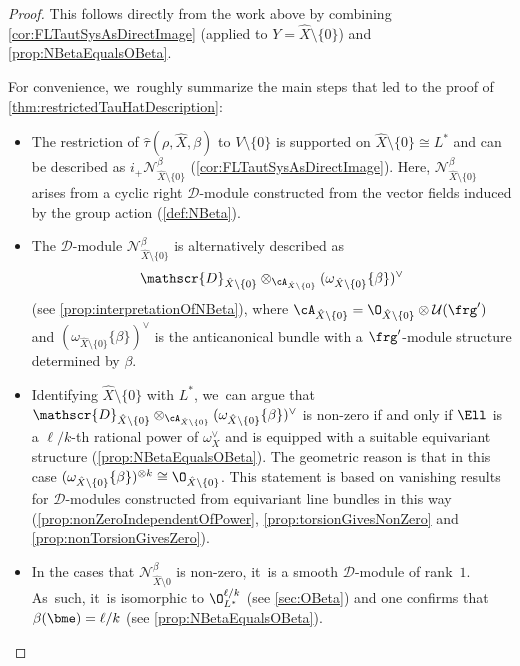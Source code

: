 \begin{proof}
This follows directly from the work above by combining \cref{cor:FLTautSysAsDirectImage} (applied to $Y = \hat X \setminus \{0\}$) and \cref{prop:NBetaEqualsOBeta}.

For convenience, we~roughly summarize the main steps that led to the proof of \cref{thm:restrictedTauHatDescription}:

\begin{itemize}
\item The restriction of $\hat{\tau}(\rho, \hat{X}, \beta)$ to $V \setminus \{0\}$ is supported on $\hat X \setminus \{0\} \cong L^*$ and can be described as $i_+ \mathscr N_{\hat X \setminus \{0\}}^\beta$ (\cref{cor:FLTautSysAsDirectImage}). Here, $\mathscr N_{\hat X \setminus \{0\}}^\beta$ arises from a cyclic right $\mathscr D$\nobreakdash-mod\-ule constructed from the vector fields induced by the group action (\cref{def:NBeta}).
\item The $\mathscr D$\nobreakdash-mod\-ule $\mathscr N_{\hat X \setminus \{0\}}^\beta$ is alternatively described as
\[
\mathscr{D}_{\hat X \setminus \{0\}} \otimes_{\cA_{\hat X \setminus \{0\}}} (\omega_{\hat X \setminus \{0\}}\{\beta\})^\vee
\]
(see \cref{prop:interpretationOfNBeta}), where $\cA_{\hat X \setminus \{0\}} = \O_{\hat X \setminus \{0\}} \otimes \mathcal U(\frg')$ and $(\omega_{\hat X \setminus \{0\}}\{\beta\})^\vee$ is the anticanonical bundle with a $\frg'$\nobreakdash-mod\-ule structure determined by $\beta$.
\item Identifying $\hat X \setminus \{0\}$ with $L^*$, we~can argue that $\mathscr{D}_{\hat X \setminus \{0\}} \otimes_{\cA_{\hat X \setminus \{0\}}} (\omega_{\hat X \setminus \{0\}}\{\beta\})^\vee$ is non-zero if and only if $\Ell$ is a $\ell/k$-th rational power of $\omega_X^\vee$ and is equipped with a suitable equivariant structure (\cref{prop:NBetaEqualsOBeta}). The geometric reason is that in this case $(\omega_{\hat X \setminus \{0\}}\{\beta\})^{\otimes k} \cong \O_{\hat X \setminus \{0\}}$. This statement is based on vanishing results for $\mathscr D$\nobreakdash-mod\-ules constructed from equivariant line bundles in this way (\cref{prop:nonZeroIndependentOfPower}, \cref{prop:torsionGivesNonZero} and \cref{prop:nonTorsionGivesZero}).
\item In the cases that $\mathscr N_{\hat X \setminus 0}^\beta$ is non-zero, it~is a smooth $\mathscr D$\nobreakdash-mod\-ule of rank~$1$. As~such, it~is isomorphic to $\O_{L^*}^{\ell/k}$ (see \cref{sec:OBeta}) and one confirms that $\beta(\bme) = \ell/k$ (see \cref{prop:NBetaEqualsOBeta}). \qedhere
\end{itemize}
\end{proof}

